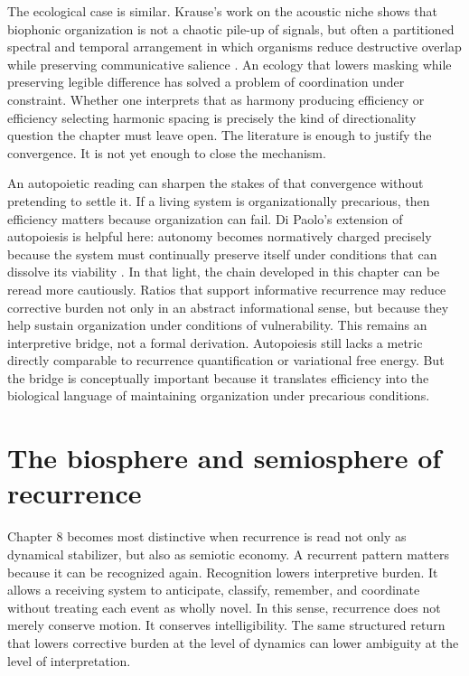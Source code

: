 The ecological case is similar. Krause's work on the acoustic niche shows that biophonic organization is not a chaotic pile-up of signals, but often a partitioned spectral and temporal arrangement in which organisms reduce destructive overlap while preserving communicative salience \parencite{krause_2013}. An ecology that lowers masking while preserving legible difference has solved a problem of coordination under constraint. Whether one interprets that as harmony producing efficiency or efficiency selecting harmonic spacing is precisely the kind of directionality question the chapter must leave open. The literature is enough to justify the convergence. It is not yet enough to close the mechanism.

An autopoietic reading can sharpen the stakes of that convergence without pretending to settle it. If a living system is organizationally precarious, then efficiency matters because organization can fail. Di Paolo's extension of autopoiesis is helpful here: autonomy becomes normatively charged precisely because the system must continually preserve itself under conditions that can dissolve its viability \parencite{dipaolo_2005}. In that light, the chain developed in this chapter can be reread more cautiously. Ratios that support informative recurrence may reduce corrective burden not only in an abstract informational sense, but because they help sustain organization under conditions of vulnerability. This remains an interpretive bridge, not a formal derivation. Autopoiesis still lacks a metric directly comparable to recurrence quantification or variational free energy. But the bridge is conceptually important because it translates efficiency into the biological language of maintaining organization under precarious conditions.

\section{The biosphere and semiosphere of recurrence}

Chapter 8 becomes most distinctive when recurrence is read not only as dynamical stabilizer, but also as semiotic economy. A recurrent pattern matters because it can be recognized again. Recognition lowers interpretive burden. It allows a receiving system to anticipate, classify, remember, and coordinate without treating each event as wholly novel. In this sense, recurrence does not merely conserve motion. It conserves intelligibility. The same structured return that lowers corrective burden at the level of dynamics can lower ambiguity at the level of interpretation.


